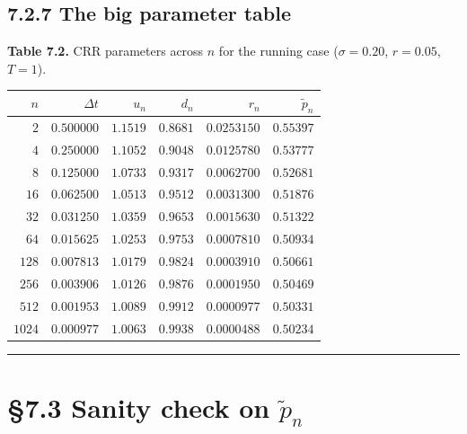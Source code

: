 \documentclass[
  10pt,
  twoside]{book}
\newcounter{none} %
\begin{document}
\subsection{7.2.7 The big parameter
table}\label{the-big-parameter-table}

\textbf{Table 7.2.} CRR parameters across \(n\) for the running case
(\(\sigma = 0.20\), \(r = 0.05\), \(T = 1\)).

{\def\LTcaptype{none} %
\begin{table}[H]
\centering
\begin{tabular}{|r|r|r|r|r|r|}
\toprule
\(n\) & \(\Delta t\) & \(u_n\) & \(d_n\) & \(r_n\) & \(\tilde p_n\) \\
\midrule



\(\phantom{000}2\) & \(0.500000\) & \(1.1519\) & \(0.8681\) &
\(0.0253150\) & \(0.55397\) \\
\(\phantom{000}4\) & \(0.250000\) & \(1.1052\) & \(0.9048\) &
\(0.0125780\) & \(0.53777\) \\
\(\phantom{000}8\) & \(0.125000\) & \(1.0733\) & \(0.9317\) &
\(0.0062700\) & \(0.52681\) \\
\(\phantom{00}16\) & \(0.062500\) & \(1.0513\) & \(0.9512\) &
\(0.0031300\) & \(0.51876\) \\
\(\phantom{00}32\) & \(0.031250\) & \(1.0359\) & \(0.9653\) &
\(0.0015630\) & \(0.51322\) \\
\(\phantom{00}64\) & \(0.015625\) & \(1.0253\) & \(0.9753\) &
\(0.0007810\) & \(0.50934\) \\
\(\phantom{0}128\) & \(0.007813\) & \(1.0179\) & \(0.9824\) &
\(0.0003910\) & \(0.50661\) \\
\(\phantom{0}256\) & \(0.003906\) & \(1.0126\) & \(0.9876\) &
\(0.0001950\) & \(0.50469\) \\
\(\phantom{0}512\) & \(0.001953\) & \(1.0089\) & \(0.9912\) &
\(0.0000977\) & \(0.50331\) \\
\(1024\) & \(0.000977\) & \(1.0063\) & \(0.9938\) & \(0.0000488\) &
\(0.50234\) \\
\bottomrule
\end{tabular}
\end{table}
}

\begin{center}\rule{0.5\linewidth}{0.5pt}\end{center}

\section{\texorpdfstring{§7.3 Sanity check on
\(\tilde p_n\)}{§7.3 Sanity check on \textbackslash tilde p\_n}}\label{sanity-check-on-tilde-p_n}
\end{document}
